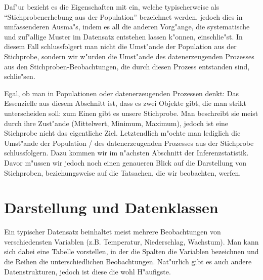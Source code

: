 \documentclass[a4paper,twoside]{tufte-book}\usepackage[]{graphicx}\usepackage[]{color}
\begin{document}
	  Daf"ur bezieht es die Eigenschaften mit ein, welche typischerweise als "`Stichprobenerhebung aus der Population"' bezeichnet werden, jedoch dies in umfassenderen Ausma"s, indem es all die anderen Vorg"ange, die systematische und zuf"allige Muster im Datensatz entstehen lassen k"onnen, einschlie"st. In diesem Fall schlussfolgert man nicht die Umst"ande der Population aus der Stichprobe, sondern wir w"urden die Umst"ande des datenerzeugenden Prozesses aus den Stichproben-Beobachtungen, die durch diesen Prozess entstanden sind, schlie"sen. 
	
	Egal, ob man in Populationen oder datenerzeugenden Prozessen denkt: Das Essenzielle aus diesem Abschnitt ist, dass es zwei Objekte gibt, die man strikt unterscheiden soll: zum Einen gibt es unsere Stichprobe. Man beschreibt sie meist durch ihre Zust"ande (Mittelwert, Minimum, Maximum), jedoch ist eine Stichprobe nicht das eigentliche Ziel. Letztendlich m"ochte man lediglich die Umst"ande der Population / des datenerzeugenden Prozesses aus der Stichprobe schlussfolgern. Dazu kommen wir im n"achsten Abschnitt der Inferenzstatistik. Davor m"ussen wir jedoch noch einen genaueren Blick auf die Darstellung von Stichproben, beziehungsweise auf die Tatsachen, die wir beobachten, werfen.
	
	\section{Darstellung und Datenklassen}
	
	Ein typischer Datensatz beinhaltet meist mehrere Beobachtungen von verschiedensten Variablen (z.B. Temperatur, Niederschlag, Wachstum). Man kann sich dabei eine Tabelle vorstellen, in der die Spalten die Variablen bezeichnen und die Reihen die unterschiedlichen Beobachtungen. Nat"urlich gibt es auch andere Datenstrukturen, jedoch ist diese die wohl H"aufigste.
	
\end{document}
